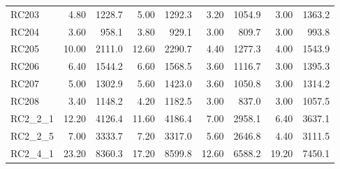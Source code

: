 \documentclass{article}
\begin{document}
{\begin{longtable}{l r r r r r r r r }
RC203 & 4.80 & 1228.7 & 5.00 & 1292.3 & 3.20 & 1054.9 & 3.00 & 1363.2 \\
RC204 & 3.60 & 958.1 & 3.80 & 929.1 & 3.00 & 809.7 & 3.00 & 993.8 \\
RC205 & 10.00 & 2111.0 & 12.60 & 2290.7 & 4.40 & 1277.3 & 4.00 & 1543.9 \\
RC206 & 6.40 & 1544.2 & 6.60 & 1568.5 & 3.60 & 1116.7 & 3.00 & 1395.3 \\
RC207 & 5.00 & 1302.9 & 5.60 & 1423.0 & 3.60 & 1050.8 & 3.00 & 1314.2 \\
RC208 & 3.40 & 1148.2 & 4.20 & 1182.5 & 3.00 & 837.0 & 3.00 & 1057.5 \\
RC2\_2\_1 & 12.20 & 4126.4 & 11.60 & 4186.4 & 7.00 & 2958.1 & 6.40 & 3637.1 \\
RC2\_2\_5 & 7.00 & 3333.7 & 7.20 & 3317.0 & 5.60 & 2646.8 & 4.40 & 3111.5 \\
RC2\_4\_1 & 23.20 & 8360.3 & 17.20 & 8599.8 & 12.60 & 6588.2 & 19.20 & 7450.1 \\
\bottomrule
\end{longtable}
}
\end{document}
